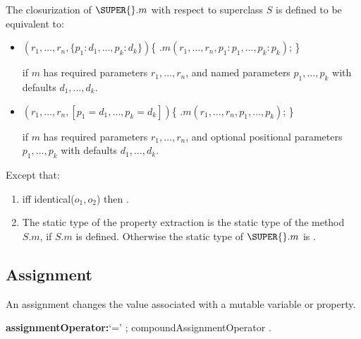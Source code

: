\documentclass{article}
\newcommand{\code}[1]{{\sf #1}}
\begin{document}
 
\LMHash{}
The closurization of $\SUPER{}.m$ with respect to superclass $S$ is defined to be equivalent to:

\begin{itemize}
\item  
\begin{dartCode}
$(r_1, \ldots, r_n, \{p_1 : d_1, \ldots , p_k : d_k\})$\{
   \RETURN{} \SUPER{}$.m(r_1, \ldots, r_n, p_1: p_1, \ldots, p_k: p_k)$;
\}
\end{dartCode}

if $m$ has required parameters $r_1, \ldots, r_n$, and named parameters $p_1, \ldots, p_k$ with defaults $d_1, \ldots, d_k$.
\item 
\begin{dartCode}
$(r_1, \ldots, r_n, [p_1 = d_1, \ldots , p_k = d_k])$\{
   \RETURN{} \SUPER{}$.m(r_1, \ldots, r_n, p_1, \ldots, p_k)$;
\} 
\end{dartCode}

if $m$ has required parameters $r_1, \ldots, r_n$, and optional positional parameters $p_1, \ldots, p_k$ with defaults $d_1, \ldots, d_k$.
\end{itemize}

\LMHash{}
Except that:
\begin{enumerate}
\item  iff  \code{identical($o_1, o_2$)}  then .
\item 
The static type of the property extraction is the static type of the method $S.m$,  if $S.m$ is defined. Otherwise the static type of $\SUPER{}.m$ is \DYNAMIC{}.
\end{enumerate}


\subsection{ Assignment}

\LMHash{}
An assignment changes the value associated with a mutable variable or property.

\begin{grammar}
{\bf assignmentOperator:}`=' ;
      compoundAssignmentOperator
    .
\end{grammar}
\end{document}
